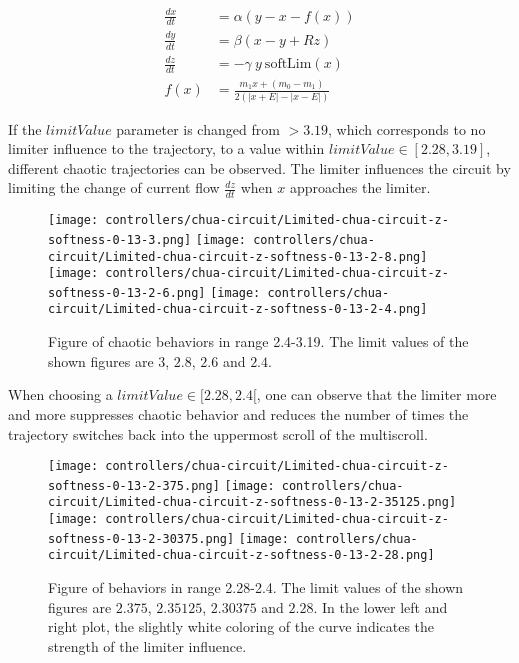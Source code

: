 \documentclass[main]{subfiles}
\begin{document}
\begin{align*}
\frac{dx}{dt}&=\alpha (y-x-f(x)) \\
\frac{dy}{dt}&=\beta (x-y + Rz)\\
\frac{dz}{dt}&=-\gamma ~ y ~ \text{softLim}(x)\\
f (x) &= \frac{m_1 x + (m_0 - m_1)}{2 (| x + E | -| x - E |)}
\end{align*}

If the $limitValue$ parameter is changed from \(>3.19\), which corresponds to no limiter influence to the trajectory, to a value within \(limitValue \in [2.28,3.19]\), different chaotic trajectories can be observed. %
%
The limiter influences the circuit by limiting the change of current flow \(\frac{dz}{dt}\) when \(x\) approaches the limiter.

\begin{figure}[H]
\centering
\texttt{[image: controllers/chua-circuit/Limited-chua-circuit-z-softness-0-13-3.png]}
\texttt{[image: controllers/chua-circuit/Limited-chua-circuit-z-softness-0-13-2-8.png]}
\texttt{[image: controllers/chua-circuit/Limited-chua-circuit-z-softness-0-13-2-6.png]}
\texttt{[image: controllers/chua-circuit/Limited-chua-circuit-z-softness-0-13-2-4.png]}
\caption[Figure of chaotic behaviors in range 2.4-3.19]{Figure of chaotic behaviors in range 2.4-3.19. The limit values of the shown figures are \(3\), \(2.8\), \(2.6\) and \(2.4\).}
\label{figure:z-2.4-3.19-chaotictrajectories}
\end{figure}

When choosing a \(limitValue \in [2.28,2.4[\), one can observe that the limiter more and more suppresses chaotic behavior and reduces the number of times the trajectory switches back into the uppermost scroll of the multiscroll.

\begin{figure}[H]
\centering
\texttt{[image: controllers/chua-circuit/Limited-chua-circuit-z-softness-0-13-2-375.png]}
\texttt{[image: controllers/chua-circuit/Limited-chua-circuit-z-softness-0-13-2-35125.png]}
\texttt{[image: controllers/chua-circuit/Limited-chua-circuit-z-softness-0-13-2-30375.png]}
\texttt{[image: controllers/chua-circuit/Limited-chua-circuit-z-softness-0-13-2-28.png]}
\caption[Figure of behaviors in range 2.28-2.4]{Figure of behaviors in range 2.28-2.4. The limit values of the shown figures are \(2.375\), \(2.35125\), \(2.30375\) and \(2.28\). In the lower left and right plot, the slightly white coloring of the curve indicates the strength of the limiter influence.}
\label{figure:z-2.28-2.4-chaotictrajectories}
\end{figure}
\end{document}
